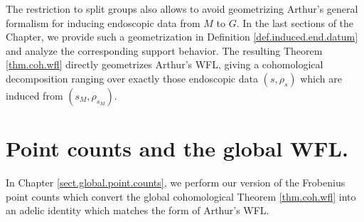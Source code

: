 \documentclass[openany]{amsbook}
\theoremstyle{definition}
\theoremstyle{remark}
\numberwithin{equation}{section}
\renewcommand{\-}{\operatorname{-}}
\begin{document}
The restriction to split groups also allows \cite{CLII} to avoid geometrizing Arthur's general formalism for inducing endoscopic data from $M$ to $G$. In the last sections of the Chapter, we provide such a geometrization in Definition \ref{def.induced.end.datum} and analyze the corresponding support behavior. The resulting Theorem \ref{thm.coh.wfl} directly geometrizes Arthur's WFL, giving a cohomological decomposition ranging over exactly those endoscopic data $(s, \rho_s)$ which are induced from $(s_M, \rho_{s_M})$. 



\section{Point counts and the global WFL.}

In Chapter \ref{sect.global.point.counts}, we perform our version of the Frobenius point counts which convert the global cohomological Theorem \ref{thm.coh.wfl} into an adelic identity which matches the form of Arthur's WFL.
\end{document}
